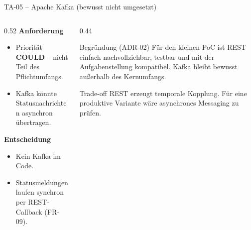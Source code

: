 \begin{frame}{TA-05 -- Apache Kafka (bewusst nicht umgesetzt)}
  \begin{columns}[T,onlytextwidth]
    \begin{column}{0.52\textwidth}
      \textbf{Anforderung}
      \begin{itemize}
        \item Priorität \textbf{COULD} -- nicht Teil des Pflichtumfangs.
        \item Kafka könnte Statusnachrichten asynchron übertragen.
      \end{itemize}

      \vspace{0.3cm}
      \textbf{Entscheidung}
      \begin{itemize}
        \item Kein Kafka im Code.
        \item Statusmeldungen laufen synchron per REST-Callback (FR-09).
      \end{itemize}
    \end{column}
    \begin{column}{0.44\textwidth}
      \begin{block}{Begründung (ADR-02)}
        \small Für den kleinen PoC ist REST einfach nachvollziehbar, testbar und mit der Aufgabenstellung kompatibel. Kafka bleibt bewusst au\ss{}erhalb des Kernumfangs.
      \end{block}
      \vspace{0.2cm}
      \begin{block}{Trade-off}
        \small REST erzeugt temporale Kopplung. Für eine produktive Variante wäre asynchrones Messaging zu prüfen.
      \end{block}
    \end{column}
  \end{columns}
\end{frame}
